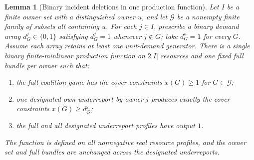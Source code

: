 \documentclass[11pt]{article}
\newtheorem{lemma}[theorem]{Lemma}
\theoremstyle{definition}
\theoremstyle{remark}
\begin{document}
\begin{lemma}[Binary incident deletions in one production function]
\label{lem:realization}
Let $I$ be a finite owner set with a distinguished owner $u$, and let
$\mathcal G$ be a nonempty finite family of subsets all containing $u$.
For each $j\in I$, prescribe a binary demand array
$d_G^j\in\{0,1\}$ satisfying $d_G^j=1$ whenever $j\notin G$;
take $d_G^u=1$ for every $G$.  Assume each array retains at least one
unit-demand generator.  There is a single binary finite-minlinear
production function on $2|I|$ resources and one fixed full bundle per
owner such that:
\begin{enumerate}
\item the full coalition game has the cover constraints
      $x(G)\ge1$ for $G\in\mathcal G$;
\item one designated own underreport by owner $j$ produces exactly the
      cover constraints $x(G)\ge d_G^j$;
\item the full and all designated underreport profiles have output $1$.
\end{enumerate}
The function is defined on all nonnegative real resource profiles, and
the owner set and full bundles are unchanged across the designated
underreports.
\end{lemma}
\end{document}
